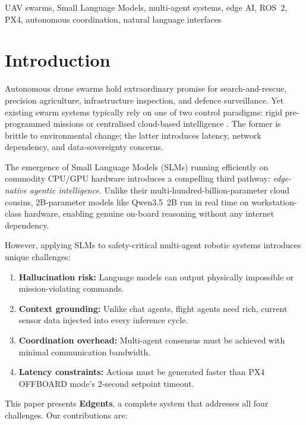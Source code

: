 \documentclass[conference]{IEEEtran}
\begin{document}
\begin{IEEEkeywords}
UAV swarms, Small Language Models, multi-agent systems, edge AI, ROS~2, PX4, autonomous coordination, natural language interfaces
\end{IEEEkeywords}

\section{Introduction}
\label{sec:intro}

Autonomous drone swarms hold extraordinary promise for search-and-rescue, precision agriculture, infrastructure inspection, and defence surveillance. Yet existing swarm systems typically rely on one of two control paradigms: rigid pre-programmed missions \cite{ref_swarm_old} or centralised cloud-based intelligence \cite{ref_cloud_drone}. The former is brittle to environmental change; the latter introduces latency, network dependency, and data-sovereignty concerns.

The emergence of Small Language Models (SLMs) running efficiently on commodity CPU/GPU hardware introduces a compelling third pathway: \emph{edge-native agentic intelligence}. Unlike their multi-hundred-billion-parameter cloud cousins, 2B-parameter models like Qwen3.5~2B run in real time on workstation-class hardware, enabling genuine on-board reasoning without any internet dependency.

However, applying SLMs to safety-critical multi-agent robotic systems introduces unique challenges:
\begin{enumerate}
    \item \textbf{Hallucination risk:} Language models can output physically impossible or mission-violating commands.
    \item \textbf{Context grounding:} Unlike chat agents, flight agents need rich, current sensor data injected into every inference cycle.
    \item \textbf{Coordination overhead:} Multi-agent consensus must be achieved with minimal communication bandwidth.
    \item \textbf{Latency constraints:} Actions must be generated faster than PX4 OFFBOARD mode's 2-second setpoint timeout.
\end{enumerate}

This paper presents \textbf{Edgents}, a complete system that addresses all four challenges. Our contributions are:
\end{document}
